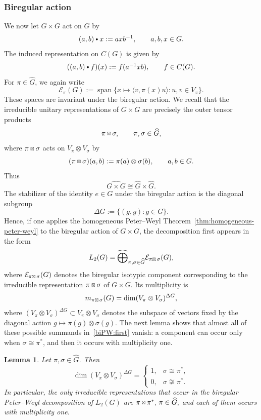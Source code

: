 \documentclass[11pt,showkeys]{amsart}
\newcommand{\sboxtimes}
{\mathbin{\vcenter{\hbox{\scalebox{0.65}{$\boxtimes$}}}}}
\newtheorem{lemma}[theorem]{Lemma}
\newcommand{\hbullet}{\mathbin{\vcenter{\hbox{\scalebox{0.7}{$\bullet$}}}}}
\begin{document}
\subsubsection{Biregular action}
\label{sec:Biregular action}

We now let \(G\times G\) act on \(G\) by
\[
        (a,b)\hbullet x
        :=
        axb^{-1},
        \qquad
        a,b,x\in G.
\]
The induced representation on \(C(G)\) is given by
\[
        ((a,b)\hbullet f)(x)
        :=
        f(a^{-1}xb),
        \qquad
        f\in C(G).
\]
For \(\pi\in\widehat G\), we again write
\[
\mathcal E_\pi(G)
:=
\operatorname{span}
\bigl\{
x\longmapsto\langle v,\pi(x)u\rangle:
u,v\in V_\pi
\bigr\}.
\]
These spaces are invariant under the biregular action.
We recall that the irreducible unitary representations of \(G\times G\)
are precisely the outer tensor products
\[
        \pi\sboxtimes\sigma,
        \qquad
        \pi,\sigma\in\widehat G,
\]
where \(\pi\sboxtimes\sigma\) acts on \(V_\pi\otimes V_\sigma\) by
\[
        (\pi\sboxtimes\sigma)(a,b)
        :=
        \pi(a)\otimes\sigma(b),
        \qquad
        a,b\in G.
\]
Thus
\[
        \widehat{G\times G}
        \cong
        \widehat G\times\widehat G.
\]
The stabilizer of the identity \(e\in G\) under the biregular action is
the diagonal subgroup
\[
        \Delta G
        :=
        \big\{(g,g):g\in G\big\}.
\]
Hence, if one applies the homogeneous Peter--Weyl Theorem~\ref{thm:homogeneous-peter-weyl} to the
biregular action of \(G\times G\), the decomposition first appears in
the form
\begin{equation} \label{biPW:first}
     L_2(G)
        =
        \widehat{\bigoplus}_{\pi,\sigma\in\widehat G}
        \mathcal E_{\pi\sboxtimes\,\sigma}(G),
\end{equation}
where \(\mathcal E_{\pi\sboxtimes\,\sigma}(G)\) denotes the biregular
isotypic component corresponding to the irreducible representation
\(\pi\sboxtimes\sigma\) of \(G\times G\). Its multiplicity is
\[
        m_{\pi\sboxtimes\,\sigma}(G)
        =
        \dim(V_\pi\otimes V_\sigma)^{\Delta G},
\]
where \((V_\pi\otimes V_\sigma)^{\Delta G}
\subset V_\pi\otimes V_\sigma
\) denotes the subspace of
vectors fixed by the diagonal action
\(
        g\longmapsto \pi(g)\otimes\sigma(g).
\)
The next lemma shows that almost all of these possible summands in~\eqref{biPW:first} vanish:
a component can occur only when \(\sigma\cong\pi^*\), and then it occurs
with multiplicity one.

\begin{lemma}
\label{lem:biregular-multiplicity-one}
Let \(\pi,\sigma\in\widehat G\). Then
\[
        \dim(V_\pi\otimes V_\sigma)^{\Delta G}
        =
        \begin{cases}
        1, & \sigma\cong\pi^*,\\
        0, & \sigma\not\cong\pi^*.
        \end{cases}
\]
In particular, the only irreducible representations that occur in the
biregular Peter--Weyl decomposition of \(L_2(G)\) are
\(
        \pi\sboxtimes\pi^*,\,
                \pi\in\widehat G,
\)
and each of them occurs with multiplicity one.
\end{lemma}
\end{document}

